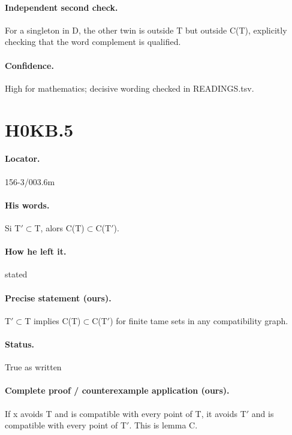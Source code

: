 \paragraph{Independent second check.} For a singleton in D, the other twin is outside T but outside C(T), explicitly checking that the word complement is qualified.

\paragraph{Confidence.} High for mathematics; decisive wording checked in READINGS.tsv.

\section*{H0KB.5}\label{statement:H0KB.5}
\paragraph{Locator.} 156-3/003.6m

\paragraph{His words.} Si T\ensuremath{\prime}\ensuremath{\subset}T, alors C(T)\ensuremath{\subset}C(T\ensuremath{\prime}).

\paragraph{How he left it.} stated

\paragraph{Precise statement (ours).} T\ensuremath{\prime}\ensuremath{\subset}T implies C(T)\ensuremath{\subset}C(T\ensuremath{\prime}) for finite tame sets in any compatibility graph.

\paragraph{Status.} True as written

\paragraph{Complete proof / counterexample application (ours).} If x avoids T and is compatible with every point of T, it avoids T\ensuremath{\prime} and is compatible with every point of T\ensuremath{\prime}. This is lemma C.

